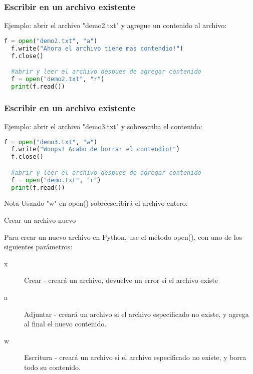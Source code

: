\begin{frame}[fragile]
  \frametitle{Escribir en un archivo existente}

  Ejemplo: abrir el archivo "demo2.txt" y agregue un
  contenido al archivo: 

  \vspace{\baselineskip}
  \begin{lstlisting}[language=Python]
  f = open("demo2.txt", "a")
  f.write("Ahora el archivo tiene mas contendio!")
  f.close()

  #abrir y leer el archivo despues de agregar contenido
  f = open("demo2.txt", "r")
  print(f.read()) 
  \end{lstlisting}
\end{frame}

\begin{frame}[fragile]
  \frametitle{Escribir en un archivo existente}

  Ejemplo: abrir el archivo "demo3.txt" y sobrescriba el
  contenido: 

  \vspace{\baselineskip}
  \begin{lstlisting}[language=Python]
  f = open("demo3.txt", "w")
  f.write("Woops! Acabo de borrar el contendio!")
  f.close()

  #abrir y leer el archivo despues de agregar contenido
  f = open("demo.txt", "r")
  print(f.read())
  \end{lstlisting}

  \vspace{\baselineskip}
  \begin{alertblock}{Nota}
    Usando "w" en open() sobreescribirá el archivo entero.
  \end{alertblock}
\end{frame}


\begin{frame}[c]{Crear un archivo nuevo}

  Para crear un nuevo archivo en Python, use el método
  \textcolor{codeKeyword2}{open}(),
  con uno de los siguientes parámetros:

  \vspace{\baselineskip}
  \begin{description}
    \item[x] Crear - creará un archivo, devuelve un error si el archivo existe
    \pausa
    \item[a] Adjuntar - creará un archivo si el archivo especificado no
      existe, y agrega al final el nuevo contenido.
    \pausa
    \item[w] Escritura - creará un archivo si el archivo especificado no
      existe, y borra todo su contenido.
  \end{description}
\end{frame}

